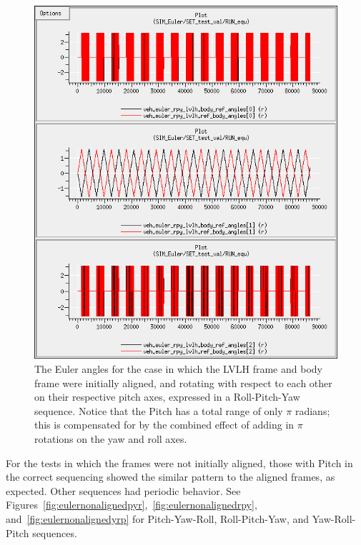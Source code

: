 \begin{description}
\begin{figure}[!ht]
\begin{center}
\includegraphics[width=5in]{figures/euler_aligned_rpy.jpg}
\caption{The Euler angles for the case in which the LVLH frame and body frame were initially aligned, and rotating with respect to each other on their respective pitch axes, expressed in a Roll-Pitch-Yaw sequence.  Notice that the Pitch has a total range of only $\pi$ radians; this is compensated for by the combined effect of adding in $\pi$ rotations on the yaw and roll axes.}
\label{fig:euleralignedrpy}
\end{center}
\end{figure}

For the tests in which the frames were not initially aligned, those with Pitch in the correct sequencing showed the similar pattern to the aligned frames, as expected.  Other sequences had periodic behavior.  See Figures~\ref{fig:eulernonalignedpyr},~\ref{fig:eulernonalignedrpy}, and~\ref{fig:eulernonalignedyrp} for Pitch-Yaw-Roll, Roll-Pitch-Yaw, and Yaw-Roll-Pitch sequences.


\end{description}
